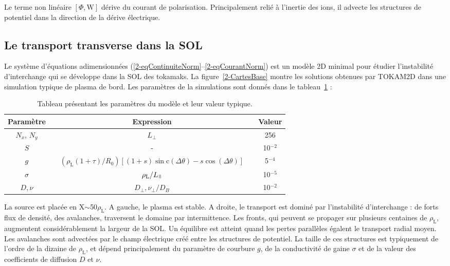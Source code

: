 \begin{refsection}
 Le terme non linéaire $[\Phi,\text{W}]$ dérive du courant de polarisation.
 Principalement relié à l'inertie des ions, il advecte les structures de
 potentiel dans la direction de la dérive électrique.
 

\subsection{Le transport transverse dans la SOL}

Le système d'équations
adimensionnées (\eqref{2-eqContinuiteNorm}--\eqref{2-eqCourantNorm}) est un
modèle 2D minimal pour étudier l'instabilité d'interchange qui se développe dans
la SOL des tokamaks. La figure~\ref{2-CartesBase} montre les solutions obtenues
par TOKAM2D dans une simulation typique de plasma de bord. Les paramètres de la
simulations sont donnés dans le tableau~\ref{2-TokamParam} :
\begin{table}[!htbp]
\footnotesize\centering
{}
\begin{tabular}{@{}ccccc@{}}\toprule
Paramètre&&Expression&&Valeur\\
\midrule 
$N_x$, $N_y$ && $L_\perp$ && 256\\
$S$ && - && 10$^{-2}$\\
$g$ &&
$(\rho_\text{L}(1+\tau)/R_0)[(1+s)\sin\text{c}(\Delta\theta)
-s\cos(\Delta\theta)]$ && 5$^{-4}$\\
$\sigma$ &&
$\rho_\text{L}/L_\para$ &&
10$^{-5}$\\
$D,\nu$ &&
$D_\perp,\nu_\perp/D_B$ &&
10$^{-2}$\\
\bottomrule
\end{tabular}
\caption{Tableau présentant les paramètres du modèle et
leur valeur typique.}\label{2-TokamParam}
\end{table}

La source est placée en X$\sim$50$\rho_\text{L}$. A gauche, le plasma est
stable. A droite, le transport est dominé par l'instabilité d'interchange : de
forts flux de densité, des avalanches, traversent le domaine par intermittence.
Les fronts, qui peuvent se propager sur plusieurs centaines de
$\rho_\text{L}$, augmentent considérablement la largeur de la SOL.
Un équilibre est atteint quand les pertes parallèles égalent le transport
radial moyen.
Les avalanches sont advectées par le champ électrique créé entre les structures
de potentiel. La taille de ces structures est typiquement de l'ordre de la
dizaine de $\rho_\text{L}$, et dépend principalement 
du paramètre de courbure $g$, de la conductivité de gaine $\sigma$ et de la
valeur des coefficients de diffusion $D$ et $\nu$.


\end{refsection}
